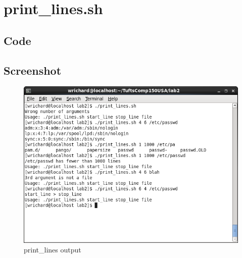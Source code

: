 \documentclass[a4paper,10pt]{article}
\begin{document}
\section{print\_lines.sh}

\subsection{Code}


\subsection{Screenshot}
\begin{figure}[H]
 \centering
 \includegraphics[width=\linewidth]{./print_lines.png}
 \caption{print\_lines output}
 \label{fig:myps}
\end{figure}
\end{document}
